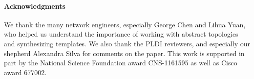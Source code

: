 \documentclass[numbers, 10pt]{sigplanconf}
\newcommand{\para}[1]{\paragraph*{\textbf{#1}}}
\begin{document}
\para{Acknowledgments}
We thank the many network engineers, especially George Chen and Lihua Yuan, who helped us understand the importance of working with abstract topologies and synthesizing templates. 
We also thank the PLDI reviewers, and especially our shepherd Alexandra Silva for comments on the paper. This work is supported in part by the National Science Foundation award CNS-1161595 as well as Cisco award 677002.


%
%
%
%

\balance






%
%
%
%
\end{document}
